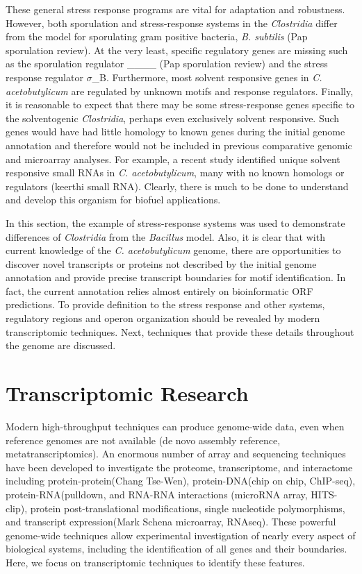 These general stress response programs are vital for adaptation and robustness. However, both sporulation and stress-response systems in the \textit{Clostridia} differ from the model for sporulating gram positive bacteria, \textit{B. subtilis} (Pap sporulation review). At the very least, specific regulatory genes are missing such as the sporulation regulator ____ (Pap sporulation review) and the stress response regulator $\sigma$_B. Furthermore, most solvent responsive genes in \textit{C. acetobutylicum} are regulated by unknown motifs and response regulators. Finally, it is reasonable to expect that there may be some stress-response genes specific to the solventogenic \textit{Clostridia}, perhaps even exclusively solvent responsive. Such genes would have had little homology to known genes during the initial genome annotation and therefore would not be included in previous comparative genomic and microarray analyses. For example, a recent study identified unique solvent responsive small RNAs in \textit{C. acetobutylicum}, many with no known homologs or regulators (keerthi small RNA). Clearly, there is much to be done to understand and develop this organism for biofuel applications.

In this section, the example of stress-response systems was used to demonstrate differences of \textit{Clostridia} from the \textit{Bacillus} model. Also, it is clear that with current knowledge of the \textit{C. acetobutylicum} genome, there are opportunities to discover novel transcripts or proteins not described by the initial genome annotation and provide precise transcript boundaries for motif identification. In fact, the current annotation relies almost entirely on bioinformatic ORF predictions. To provide definition to the stress response and other systems, regulatory regions and operon organization should be revealed by modern transcriptomic techniques. Next, techniques that provide these details throughout the genome are discussed.

\section{Transcriptomic Research}
Modern high-throughput techniques can produce genome-wide data, even when reference genomes are not available (de novo assembly reference, metatranscriptomics). An enormous number of array and sequencing techniques have been developed to investigate the proteome, transcriptome, and interactome including protein-protein(Chang Tse-Wen), protein-DNA(chip on chip, ChIP-seq), protein-RNA(pulldown, and RNA-RNA interactions (microRNA array, HITS-clip), protein post-translational modifications, single nucleotide polymorphisms, and transcript expression(Mark Schena microarray, RNAseq). These powerful genome-wide techniques allow experimental investigation of nearly every aspect of biological systems, including the identification of all genes and their boundaries. Here, we focus on transcriptomic techniques to identify these features. 

